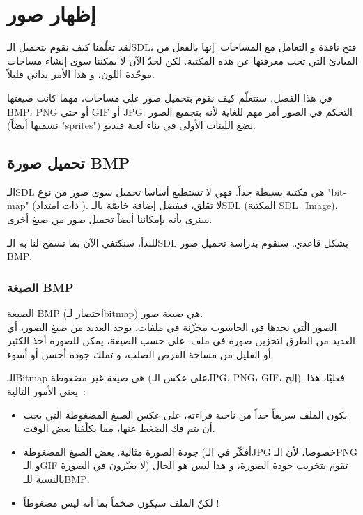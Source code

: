 \chapter{إظهار صور}

لقد تعلّمنا كيف نقوم بتحميل الـ\textenglish{SDL}،
فتح نافذة و التعامل مع المساحات. إنها بالفعل من المبادئ التي تجب معرفتها عن هذه المكتبة. لكن لحدّ الآن لا يمكننا سوى إنشاء مساحات موحّدة اللون، و هذا الأمر بدائي قليلاً.

في هذا الفصل، سنتعلّم كيف نقوم بتحميل صور على مساحات، مهما كانت صيغتها
\textenglish{BMP}،
\textenglish{PNG}
أو حتى 
\textenglish{GIF}
أو 
\textenglish{JPG}.
التحكم في الصور أمر مهم للغاية لأنه بتجميع الصور (نسميها أيضاً 
"\textenglish{sprites}")
نضع اللبنات الأولى في بناء لعبة فيديو.

\section{تحميل صورة \textenglish{BMP}}

الـ\textenglish{SDL}
هي مكتبة بسيطة جداً. فهي لا تستطيع أساسا تحميل سوى صور من نوع
"\textenglish{bitmap}"
(ذات امتداد
).
لا تقلق، فبفضل إضافة خاصّة بالـ\textenglish{SDL}
(المكتبة
\textenglish{SDL\_Image})،
 سنرى بأنه بإمكاننا أيضاً تحميل صور من صيغ أخرى.
 
 للبدأ، سنكتفي الآن بما تسمح لنا به الـ\textenglish{SDL}
 بشكل قاعدي. سنقوم بدراسة تحميل صور
\textenglish{BMP}.

\subsection{الصيغة \textenglish{BMP}}

الصيغة
\textenglish{BMP}
(اختصار لـ\textenglish{bitmap})
هي صيغة صور.\\
الصور الّتي نجدها في الحاسوب مخزّنة في ملفات. يوجد العديد من صيغ الصور، أي العديد من الطرق لتخزين صورة في ملف. على حسب الصيغة، يمكن للصورة أخذ الكثير أو القليل من مساحة القرص الصلب، و تملك جودة أحسن أو أسوء.

الـ\textenglish{Bitmap}
هي صيغة غير مضغوطة (على عكس الـ\textenglish{JPG}، \textenglish{PNG}، \textenglish{GIF}،
إلخ).
فعليّا، هذا يعني الأمور التالية~:

\begin{itemize}
	\item يكون الملف سريعاً جداً من ناحية قراءته، على عكس الصيغ المضغوطة التي يجب أن يتم فك الضغط عنها، مما يكلّفنا بعض الوقت.
	\item جودة الصورة مثالية. بعض الصيغ المضغوطة (أفكّر في الـ\textenglish{JPG}
	خصوصا، لأن الـ\textenglish{PNG}
	و الـ\textenglish{GIF}
	لا يغيّرون في الصورة) تقوم بتخريب جودة الصورة، و هذا ليس هو الحال بالنسبة للـ\textenglish{BMP}.
	\item لكنّ الملف سيكون ضخماً بما أنه ليس مضغوطاً !
\end{itemize}

